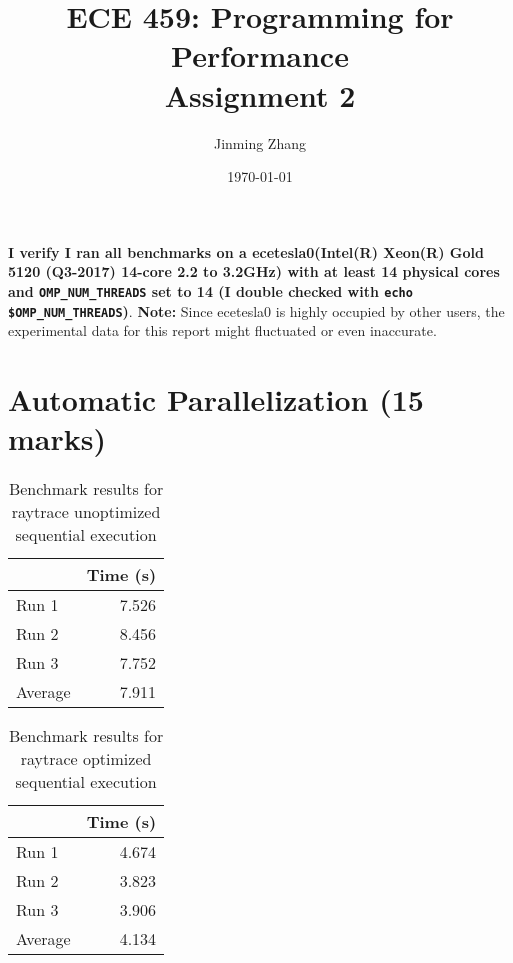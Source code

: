 \documentclass[12pt]{article}
\title{ECE 459: Programming for Performance\\Assignment 2}
\author{Jinming Zhang}
\date{\today}
\begin{document}
\maketitle

{\bf I verify I ran all benchmarks on a ecetesla0(Intel(R) Xeon(R) Gold 5120 (Q3-2017) 14-core 2.2 to 3.2GHz) with at least 14 physical cores and
{\tt OMP\_NUM\_THREADS} set to 14 (I double checked with
{\tt echo \$OMP\_NUM\_THREADS})}. \textbf{Note:} Since ecetesla0 is highly occupied by other users, the experimental data for this report might fluctuated or even inaccurate. 

\section*{Automatic Parallelization (15 marks)}

\begin{table}[H]
  \centering
  \begin{tabular}{lr}
    & {\bf Time (s)} \\
    \hline
    Run 1 & 7.526 \\
    Run 2 & 8.456 \\
    Run 3 & 7.752 \\
    \hline
    Average & 7.911 \\
  \end{tabular}
  \caption{Benchmark results for raytrace unoptimized sequential execution}
  \label{tbl-raytrace-unopt-sequential}
\end{table}

\begin{table}[H]
  \centering
  \begin{tabular}{lr}
    & {\bf Time (s)} \\
    \hline
    Run 1 & 4.674 \\
    Run 2 & 3.823 \\
    Run 3 & 3.906 \\
    \hline
    Average &  4.134\\
  \end{tabular}
  \caption{Benchmark results for raytrace optimized sequential execution}
  \label{tbl-raytrace-opt-sequential}
\end{table}
\end{document}
